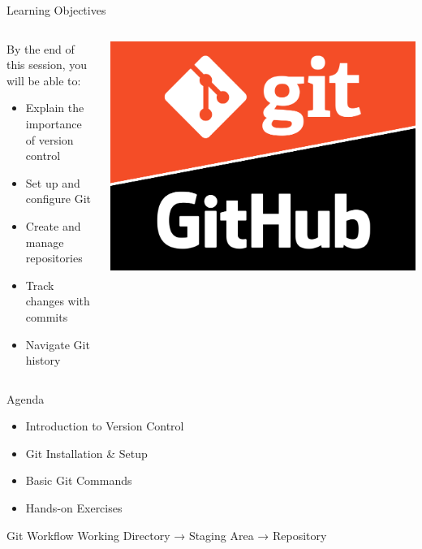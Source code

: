 \documentclass[aspectratio=169]{beamer}
\begin{document}
\begin{frame}{Learning Objectives}
  \begin{columns}
    \begin{column}{0.6\textwidth}
      \begin{block}{By the end of this session, you will be able to:}
        \begin{itemize}
          \item Explain the importance of version control
          \item Set up and configure Git
          \item Create and manage repositories
          \item Track changes with commits
          \item Navigate Git history
        \end{itemize}
      \end{block}
    \end{column}
    \begin{column}{0.35\textwidth}
      \includegraphics[width=\textwidth]{figures/gitGithub.png}
    \end{column}
  \end{columns}
\end{frame}

\begin{frame}{Agenda}
  \begin{itemize}
    \item Introduction to Version Control
    \item Git Installation \& Setup
    \item Basic Git Commands
    \item Hands-on Exercises
  \end{itemize}
  
  \vspace{1em}
  \begin{block}{Git Workflow}
    Working Directory → Staging Area → Repository
  \end{block}
\end{frame}
\end{document}
